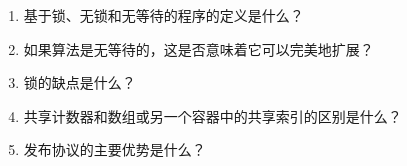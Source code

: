 \begin{enumerate}
\item 
基于锁、无锁和无等待的程序的定义是什么？

\item 
如果算法是无等待的，这是否意味着它可以完美地扩展？

\item 
锁的缺点是什么？

\item
共享计数器和数组或另一个容器中的共享索引的区别是什么？

\item
发布协议的主要优势是什么？
\end{enumerate}